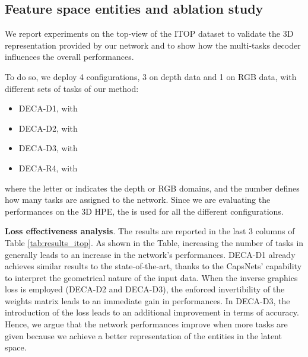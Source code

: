 \documentclass[10pt,twocolumn,letterpaper]{article}
\begin{document}
\subsection{Feature space entities and ablation study}
\label{sec:ablation}

We report experiments on the top-view of the ITOP dataset \cite{haque2016towards} to validate the 3D representation provided by our network and to show how the multi-tasks decoder influences the overall performances. 

To do so, we deploy 4 configurations, 3 on depth data and 1 on RGB data, with different sets of tasks  of our method:
\begin{itemize}
    \item DECA-D1, with 
    \item DECA-D2, with 
    \item DECA-D3, with 
    \item DECA-R4, with 
\end{itemize}



where the letter  or  indicates the depth or RGB domains, and the number defines how many tasks are assigned to the network.
Since we are evaluating the performances on the 3D HPE, the  is used for all the different configurations.

\textbf{Loss effectiveness analysis}. 
The results are reported in the last 3 columns of Table \ref{tab:results_itop}. As shown in the Table, increasing the number of tasks in  generally leads to an increase in the network's performances. DECA-D1 already achieves similar results to the state-of-the-art, thanks to the CapsNets' capability to interpret the geometrical nature of the input data. When the inverse graphics loss  is employed (DECA-D2 and DECA-D3), the enforced invertibility of the weights matrix leads to an immediate gain in performances. 
In DECA-D3, the introduction of the  loss leads to an additional improvement in terms of accuracy. Hence, we argue that the network performances improve when more tasks are given because we achieve a better representation of the entities in the latent space.
\end{document}
